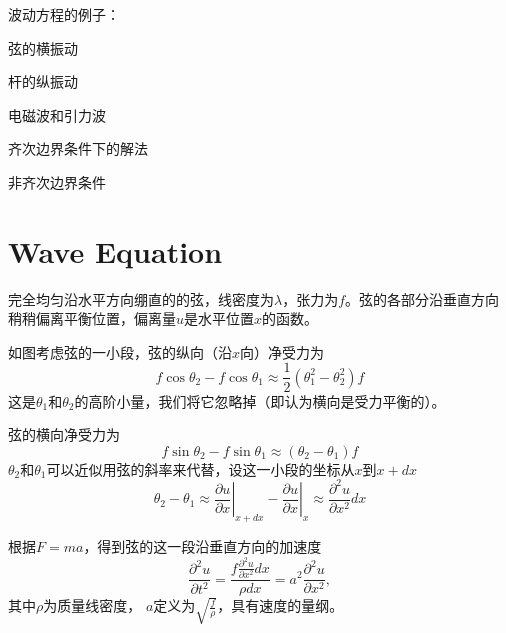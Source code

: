 \documentclass[CJK]{beamer}
\date{}
\begin{document}

\begin{frame}
\bch
\bitem
\item{波动方程的例子：
  \bitem
\item{弦的横振动}
\item{杆的纵振动}
\item{电磁波和引力波}
  \eitem}
\item{齐次边界条件下的解法}
\item{非齐次边界条件}  
\eitem
\ech
\end{frame}


\section{Wave Equation}

\begin{frame}
\bch
完全均匀沿水平方向绷直的的弦，线密度为$\lambda$，张力为$f$。弦的各部分沿垂直方向稍稍偏离平衡位置，偏离量$u$是水平位置$x$的函数。


如图考虑弦的一小段，弦的纵向（沿$x$向）净受力为 $$ f \cos\theta_2 - f\cos\theta_1 \approx \frac{1}{2}\left(\theta_1^2-\theta_2^2\right) f $$
这是$\theta_1$和$\theta_2$的高阶小量，我们将它忽略掉（即认为横向是受力平衡的）。

\ech
\end{frame}



\begin{frame}
\bch
{}

弦的横向净受力为 $$ f \sin\theta_2 - f\sin\theta_1 \approx \left(\theta_2-\theta_1\right) f $$
$\theta_2$和$\theta_1$可以近似用弦的斜率来代替，设这一小段的坐标从$x$到$x+dx$
$$\theta_2-\theta_1 \approx \left.\frac{\partial u}{\partial x}\right\vert_{x+dx}-\left.\frac{\partial u}{\partial x}\right\vert_{x} \approx \frac{\partial^2u}{\partial x^2} dx $$

\ech
\end{frame}


\begin{frame}
\bch
{}
根据$F=ma$，得到弦的这一段沿垂直方向的加速度
$$\frac{\partial ^2u}{\partial t^2} = \frac{f\frac{\partial^2u}{\partial x^2} dx}{\rho dx} = a^2 \frac{\partial^2u}{\partial x^2} ,$$
其中$\rho$为质量线密度， $a$定义为$\sqrt{\frac{f}{\rho}}$，具有速度的量纲。

\ech
\end{frame}
\end{document}
